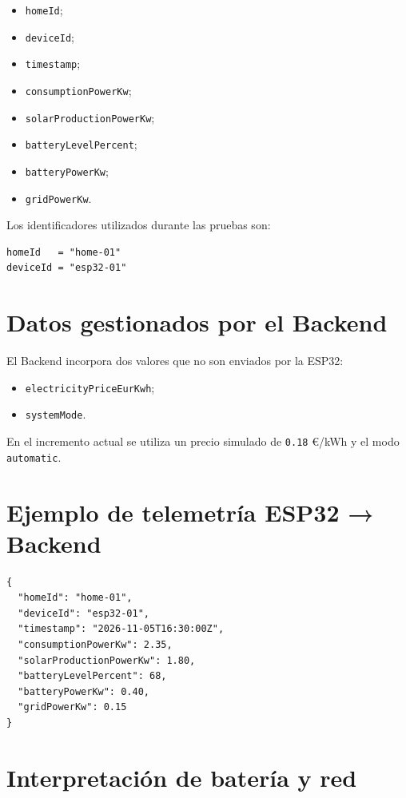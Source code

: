 \documentclass[11pt,a4paper,oneside]{report}
\begin{document}
\begin{itemize}
\item \texttt{homeId};
\item \texttt{deviceId};
\item \texttt{timestamp};
\item \texttt{consumptionPowerKw};
\item \texttt{solarProductionPowerKw};
\item \texttt{batteryLevelPercent};
\item \texttt{batteryPowerKw};
\item \texttt{gridPowerKw}.
\end{itemize}

Los identificadores utilizados durante las pruebas son:

\begin{verbatim}
homeId   = "home-01"
deviceId = "esp32-01"
\end{verbatim}

\section{Datos gestionados por el Backend}

El Backend incorpora dos valores que no son enviados por la ESP32:

\begin{itemize}
\item \texttt{electricityPriceEurKwh};
\item \texttt{systemMode}.
\end{itemize}

En el incremento actual se utiliza un precio simulado de \texttt{0.18} €/kWh y el modo \texttt{automatic}.

\section{Ejemplo de telemetría ESP32 → Backend}

\begin{verbatim}
{
  "homeId": "home-01",
  "deviceId": "esp32-01",
  "timestamp": "2026-11-05T16:30:00Z",
  "consumptionPowerKw": 2.35,
  "solarProductionPowerKw": 1.80,
  "batteryLevelPercent": 68,
  "batteryPowerKw": 0.40,
  "gridPowerKw": 0.15
}
\end{verbatim}

\section{Interpretación de batería y red}
\end{document}

